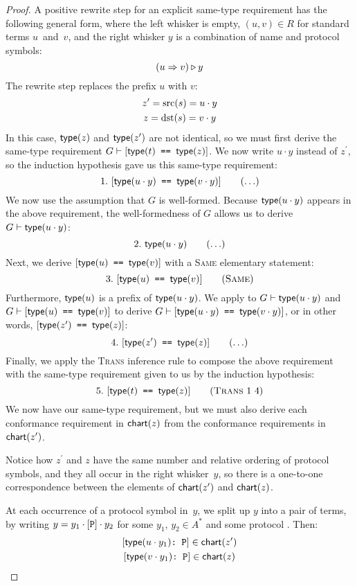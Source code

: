 \documentclass[../generics]{subfiles}
\begin{document}
\begin{proof}
 A positive rewrite step for an explicit same-type requirement has the following general form, where the left whisker is empty, $(u,v)\in R$ for standard terms $u$~and~$v$, and the right whisker $y$ is a combination of name and protocol symbols:
\[(u\Rightarrow v)\triangleright y\]
The rewrite step replaces the prefix $u$ with $v$:
\begin{gather*}
z^\prime=\operatorname{src}(s)=u\cdot y\\
z=\operatorname{dst}(s)=v\cdot y
\end{gather*}
In this case, $\mathsf{type}(z)$ and $\mathsf{type}(z^\prime)$ are not identical, so we must first derive the same-type requirement $G\vdash[\texttt{$\mathsf{type}(t)$ == $\mathsf{type}(z)$}]$. We now write $u\cdot y$ instead of $z^\prime$, so the induction hypothesis gave us this same-type requirement:
\[ \AnyStep{\SameReq{$\Type(u\cdot y)$}{$\Type(v\cdot y)$}}{1} \]
We now use the assumption that $G$ is well-formed. Because $\mathsf{type}(u\cdot y)$ appears in the above requirement, the well-formedness of $G$ allows us to derive $G\vdash\mathsf{type}(u\cdot y)$:
\[ \AnyStep{\Type(u\cdot y)}{2} \]
Next, we derive $[\texttt{$\mathsf{type}(u)$ == $\mathsf{type}(v)$}]$ with a \textsc{Same} elementary statement:
\[ \SameStep{$\Type(u)$}{$\Type(v)$}{3} \]
Furthermore, $\mathsf{type}(u)$ is a prefix of $\mathsf{type}(u\cdot y)$. We apply  to $G\vdash\texttt{$\mathsf{type}(u\cdot y)$}$ and $G\vdash[\texttt{$\mathsf{type}(u)$ == $\mathsf{type}(v)$}]$ to derive $G\vdash[\texttt{$\mathsf{type}(u\cdot y)$ == $\mathsf{type}(v\cdot y)$}]$, or in other words, $[\texttt{$\mathsf{type}(z^\prime)$ == $\mathsf{type}(z)$}]$:
\[
\AnyStep{\SameReq{$\Type(z^\prime)$}{$\Type(z)$}}{4}
\]
Finally, we apply the \textsc{Trans} inference rule to compose the above requirement with the same-type requirement given to us by the induction hypothesis:
\[
\TransStep{1}{4}{$\Type(t)$}{$\Type(z)$}{5}
\]
We now have our same-type requirement, but we must also derive each conformance requirement in $\mathsf{chart}(z)$ from the conformance requirements in $\mathsf{chart}(z^\prime)$.

Notice how $z^\prime$ and $z$ have the same number and relative ordering of protocol symbols, and they all occur in the right whisker~$y$, so there is a one-to-one correspondence between the elements of $\mathsf{chart}(z^\prime)$ and $\mathsf{chart}(z)$.

At each occurrence of a protocol symbol in~$y$, we split up $y$ into a pair of terms, by writing $y=y_1\cdot[\texttt{P}]\cdot y_2$ for some $y_1$, $y_2\in A^*$ and some protocol \tP. Then:
\begin{gather*}
\ConfReq{$\Type(u\cdot y_1)$}{P}\in\Chart(z^\prime)\\
\ConfReq{$\Type(v\cdot y_1)$}{P}\in\Chart(z)
\end{gather*}


\end{proof}
\end{document}
